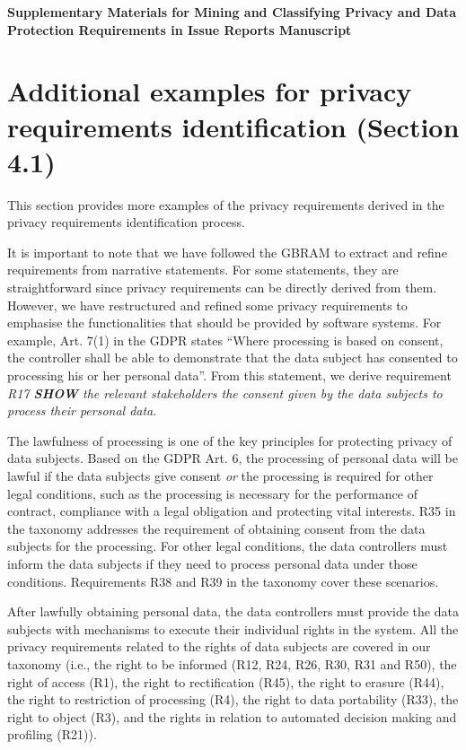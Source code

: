 \documentclass{article}
\begin{document}
\textbf{\Large{Supplementary Materials for Mining and Classifying Privacy and Data Protection Requirements in Issue Reports Manuscript}}

\section{Additional examples for privacy requirements identification (Section 4.1)}

This section provides more examples of the privacy requirements derived in the privacy requirements identification process.

It is important to note that we have followed the GBRAM to extract and refine requirements from narrative statements. For some statements, they are straightforward since privacy requirements can be directly derived from them. However, we have restructured and refined some privacy requirements to emphasise the functionalities that should be provided by software systems. For example, Art. 7(1) in the GDPR states ``Where processing is based on consent, the controller shall be able to demonstrate that the data subject has consented to processing his or her personal data''. From this statement, we derive requirement \emph{R17 \textbf{SHOW} the relevant stakeholders the consent given by the data subjects to process their personal data}.

The lawfulness of processing is one of the key principles for protecting privacy of data subjects. Based on the GDPR Art. 6, the processing of personal data will be lawful if the data subjects give consent \emph{or} the processing is required for other legal conditions, such as the processing is necessary for the performance of contract, compliance with a legal obligation and protecting vital interests. R35 in the taxonomy addresses the requirement of obtaining consent from the data subjects for the processing. For other legal conditions, the data controllers must inform the data subjects if they need to process personal data under those conditions. Requirements R38 and R39 in the taxonomy cover these scenarios.

After lawfully obtaining personal data, the data controllers must provide the data subjects with mechanisms to execute their individual rights in the system. All the privacy requirements related to the rights of data subjects are covered in our taxonomy (i.e., the right to be informed (R12, R24, R26, R30, R31 and R50), the right of access (R1), the right to rectification (R45), the right to erasure (R44), the right to restriction of processing (R4), the right to data portability (R33), the right to object (R3), and the rights in relation to automated decision making and profiling (R21)).
\end{document}

